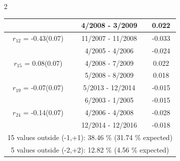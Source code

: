\begin{multicols}{2}
{\begin{tabular}{ccc}
&        4/2008 -  3/2009 &        0.022  \vspace{-.02in} \\ \hline 
  $r_{12}$ = -0.43(0.07) &      11/2007 - 11/2008 &       -0.033    \vspace{-.10in} \\ 
  &        4/2005 -  4/2006 &       -0.024  \vspace{-.02in}   \\ \hline 
    $r_{15}$ = 0.08(0.07) &       4/2008 -  7/2009 &        0.022   \vspace{-.10in} \\  
&        5/2008 -  8/2009 &        0.018  \vspace{-.02in} \\ \hline 
  $r_{19}$ = -0.07(0.07) &       5/2013 - 12/2014 &       -0.015    \vspace{-.10in} \\ 
  &        6/2003 -  1/2005 &       -0.015  \vspace{-.02in}   \\ \hline 
    $r_{24}$ = -0.14(0.07) &       4/2006 -  4/2008 &       -0.028    \vspace{-.10in} \\ 
  &       12/2014 - 12/2016 &       -0.018  \vspace{-.02in}   \\ \hline 
  \multicolumn{3}{c}{              15 values outside (-1,+1): 38.46  \% (31.74  \% expected)}\vspace{-.10in} \\ 
\multicolumn{3}{c}{               5 values outside (-2,+2): 12.82 \%  (4.56 \% expected) } \\
 \end{tabular} \\ 
 } 
\end{multicols} 
